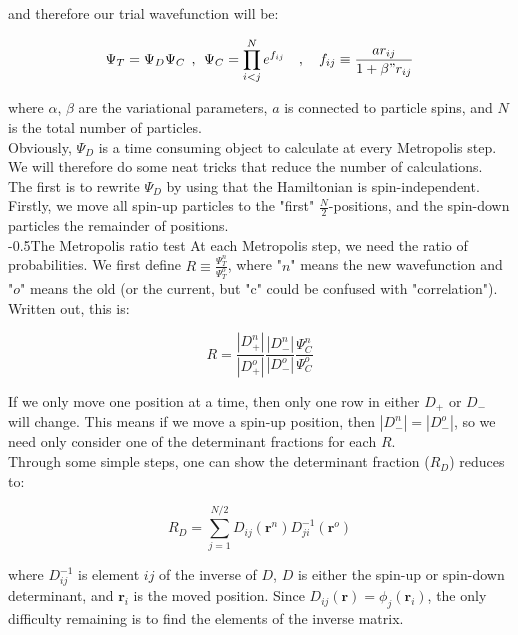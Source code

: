 \documentclass[english, a4paper]{article}
\makeatletter
\renewcommand{\subsubsection}{\@startsection{subsubsection}{3}{0pt}%
{-\baselineskip}{0.5\baselineskip}{\bf\large}}
\newcommand{\bm}[1]{\mathbf{#1}}
\makeatother
\begin{document}
and therefore our trial wavefunction will be:

\begin{equation}
	\Psi_T = \Psi_{D}\Psi_{C} \:\:,\:\: \Psi_{C} = \prod_{i<j}^N e^{f_{ij}}\quad,\quad f_{ij} \equiv\frac{ar_{ij}}{1+\beta"r_{ij}}
\end{equation}

where $\alpha$, $\beta$ are the variational parameters, $a$ is connected to particle spins, and $N$ is the total number of particles.\\
Obviously, $\Psi_{D}$ is a time consuming object to calculate at every Metropolis step. We will therefore do some neat tricks that reduce the number of calculations.\\
The first is to rewrite $\Psi_D$ by using that the Hamiltonian is spin-independent. Firstly, we move all spin-up particles to the "first" $\frac{N}{2}$-positions, and the spin-down particles the remainder of positions. \\

\subsubsection{The Metropolis ratio test}
At each Metropolis step, we need the ratio of probabilities. We first define $R\equiv\frac{\Psi_T^n}{\Psi_T^o}$, where "$n$" means the new wavefunction and "$o$" means the old (or the current, but "c" could be confused with "correlation"). Written out, this is:

\begin{equation}
	R = \frac{|D_+^n|}{|D_+^o|}\frac{|D_-^n|}{|D_-^o|}\frac{\Psi_C^n}{\Psi_C^o}
\end{equation}

If we only move one position at a time, then only one row in either $D_+$ or $D_-$ will change. This means if we move a spin-up position, then $|D_-^n| = |D_-^o|$, so we need only consider one of the determinant fractions for each $R$.\\
Through some simple steps, one can show the determinant fraction ($R_{D}$) reduces to:

\begin{equation}
	R_D = \sum_{j=1}^{N/2} D_{ij}(\bm{r}^n)D_{ji}^{-1}(\bm{r}^o)
\end{equation}

where $D_{ij}^{-1}$ is element $ij$ of the inverse of $D$, $D$ is either the spin-up or spin-down determinant, and $\bm{r}_i$ is the moved position. Since $D_{ij}(\bm{r}) = \phi_j(\bm{r}_i)$, the only difficulty remaining is to find the elements of the inverse matrix.\\
\end{document}
